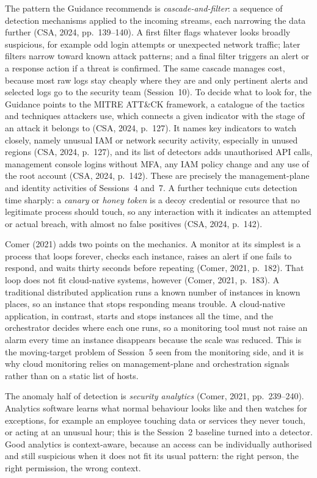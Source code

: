 The pattern the Guidance recommends is \emph{cascade-and-filter}: a sequence
of detection mechanisms applied to the incoming streams, each narrowing the
data further (CSA, 2024, pp.~139--140). A first filter flags whatever looks broadly
suspicious, for example odd login attempts or unexpected network traffic;
later filters narrow toward known attack patterns; and a final
filter triggers an alert or a response action if a threat is confirmed. The
same cascade manages cost, because most raw logs stay cheaply where they
are and only pertinent alerts and selected logs go to the security team
(Session~10). To decide what to look for, the Guidance points to the MITRE
ATT\&CK framework, a catalogue of the tactics and techniques attackers use,
which connects a given indicator with the stage of an attack it belongs to
(CSA, 2024, p.~127). It names key indicators to watch closely, namely
unusual IAM or network security activity, especially in unused regions (CSA,
2024, p.~127), and its list of detectors adds unauthorised API calls,
management console logins without MFA, any IAM policy change and any use of
the root account (CSA, 2024, p.~142). These are precisely the
management-plane and identity activities of Sessions~4 and~7. A further
technique cuts detection time sharply: a \emph{canary} or \emph{honey token}
is a decoy credential or resource that no legitimate process should touch,
so any interaction with it indicates an attempted or actual breach, with
almost no false positives (CSA, 2024, p.~142).

Comer (2021) adds two points on the mechanics. A monitor at its simplest is
a process that loops forever, checks each instance, raises an alert if one
fails to respond, and waits thirty seconds before repeating (Comer, 2021,
p.~182). That loop does not fit cloud-native systems, however (Comer, 2021,
p.~183). A traditional distributed application runs a known number of
instances in known places, so an instance that stops responding means
trouble. A cloud-native application, in contrast, starts and stops instances
all the time, and the orchestrator decides where each one runs, so a
monitoring tool must not raise an alarm every time an instance disappears
because the scale was reduced. This is the moving-target problem of Session~5 seen from
the monitoring side, and it is why cloud monitoring relies on
management-plane and orchestration signals rather than on a static list of
hosts.

The anomaly half of detection is \emph{security analytics} (Comer, 2021,
pp.~239--240). Analytics software learns what normal behaviour looks like
and then watches for exceptions, for example an employee touching data or
services they never touch, or acting at an unusual hour; this is the
Session~2 baseline turned into a detector. Good analytics is context-aware,
because an access can be individually authorised and still suspicious when
it does not fit its usual pattern: the right person, the right permission,
the wrong context.

